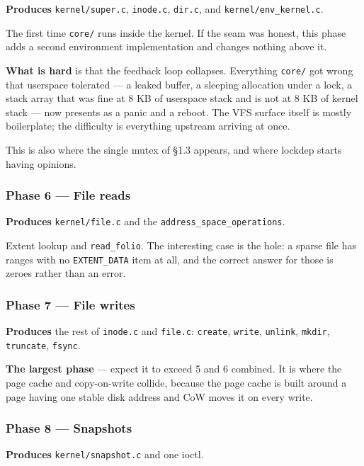 \textbf{Produces} \texttt{kernel/super.c}, \texttt{inode.c}, \texttt{dir.c}, and
\texttt{kernel/env\_kernel.c}.

The first time \texttt{core/} runs inside the kernel. If the seam was honest,
this phase adds a second environment implementation and changes nothing above
it.

\textbf{What is hard} is that the feedback loop collapses. Everything
\texttt{core/} got wrong that userspace tolerated --- a leaked buffer, a
sleeping allocation under a lock, a stack array that was fine at 8 KB of
userspace stack and is not at 8 KB of kernel stack --- now presents as a panic
and a reboot. The VFS surface itself is mostly boilerplate; the difficulty is
everything upstream arriving at once.

This is also where the single mutex of §1.3 appears, and where lockdep starts
having opinions.

\subsubsection{Phase 6 --- File reads}

\textbf{Produces} \texttt{kernel/file.c} and the
\texttt{address\_space\_operations}.

Extent lookup and \texttt{read\_folio}. The interesting case is the hole: a
sparse file has ranges with no \texttt{EXTENT\_DATA} item at all, and the
correct answer for those is zeroes rather than an error.

\subsubsection{Phase 7 --- File writes}

\textbf{Produces} the rest of \texttt{inode.c} and \texttt{file.c}:
\texttt{create}, \texttt{write}, \texttt{unlink}, \texttt{mkdir},
\texttt{truncate}, \texttt{fsync}.

\textbf{The largest phase} --- expect it to exceed 5 and 6 combined. It is
where the page cache and copy-on-write collide, because the page cache is built
around a page having one stable disk address and CoW moves it on every write.

\subsubsection{Phase 8 --- Snapshots}

\textbf{Produces} \texttt{kernel/snapshot.c} and one ioctl.

